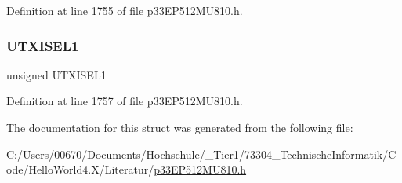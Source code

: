 Definition at line 1755 of file p33\+E\+P512\+M\+U810.\+h.

\mbox{\label{structtag_u2_s_t_a_b_i_t_s_af7ce0d24148cffc8fc3d8abccf37ea9f}} 
\subsubsection{\texorpdfstring{U\+T\+X\+I\+S\+E\+L1}{UTXISEL1}}
{\footnotesize\ttfamily unsigned U\+T\+X\+I\+S\+E\+L1}



Definition at line 1757 of file p33\+E\+P512\+M\+U810.\+h.



The documentation for this struct was generated from the following file\+:\begin{DoxyCompactItemize}
\item 
C\+:/\+Users/00670/\+Documents/\+Hochschule/\+\_\+\+Tier1/73304\+\_\+\+Technische\+Informatik/\+Code/\+Hello\+World4.\+X/\+Literatur/\hyperlink{p33_e_p512_m_u810_8h}{p33\+E\+P512\+M\+U810.\+h}\end{DoxyCompactItemize}
